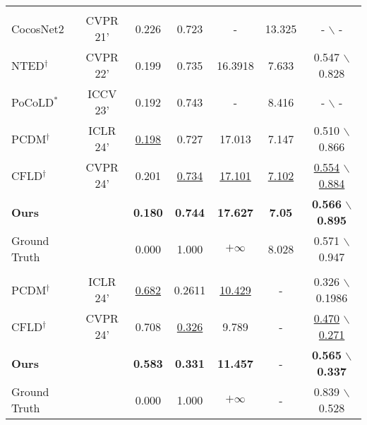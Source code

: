 \begin{tabular}{l| c| c| c| c| c| c}
    \midrule
        \rowcolor{gray!20}
            \multicolumn{7}{l}{\textit{DeepFashion (512 $\times$ 352)}} \\
             CocosNet2\cite{zhou2021cocosnet} & CVPR 21' & 0.226 & 0.723 & - & 13.325 & - $\backslash$ -\\
             NTED$^\dagger$\cite{ren2022neural} & CVPR 22' & 0.199 & 0.735 & 16.3918 & 7.633 & 0.547 $\backslash$ 0.828 \\
             \color{gray}PoCoLD$^\ast$ \cite{han2023controllable} &  \color{gray}ICCV 23' &  \color{gray}0.192 &  \color{gray}0.743 & - &  \color{gray}8.416 & - $\backslash$ -\\
             PCDM$^\dagger$\cite{shen2024advancing} & ICLR 24' & \underline{0.198} & 0.727 & 17.013 & 7.147 & 0.510 $\backslash$ 0.866 \\ %
             CFLD$^\dagger$\cite{lu2024coarse} & CVPR 24' & 0.201 & \underline{0.734} & \underline{17.101} & \underline{7.102} & \underline{0.554} $\backslash$ \underline{0.884} \\ %
            \textbf{Ours} &  & \textbf{0.180} & \textbf{0.744} & \textbf{17.627} & \textbf{7.05} & \textbf{0.566} $\backslash$ \textbf{0.895} \\
            \color{gray} Ground Truth &  & \color{gray}0.000 & \color{gray} 1.000 & \color{gray} $+\infty$  & \color{gray} 8.028 & \color{gray} 0.571 $\backslash$ \color{gray} 0.947\\
    \midrule
        \rowcolor{gray!20}
            \multicolumn{7}{l}{\textit{WPose (512 $\times$ 352)}} \\
            PCDM$^\dagger$\cite{shen2024advancing} & ICLR 24' & \underline{0.682} & 0.2611 & \underline{10.429} & - & 0.326 $\backslash$ 0.1986  \\
            CFLD$^\dagger$\cite{lu2024coarse} & CVPR 24' & 0.708 & \underline{0.326} & 9.789 & - & \underline{0.470} $\backslash$ \underline{0.271}  \\
            \textbf{Ours} & & \textbf{0.583} & \textbf{0.331} & \textbf{11.457} & - & \textbf{0.565} $\backslash$ \textbf{0.337} \\
            \color{gray} Ground Truth &  & \color{gray}0.000 & \color{gray} 1.000 & \color{gray} $+\infty$ & - & \color{gray} 0.839 $\backslash$ \color{gray} 0.528 \\
    \toprule
\end{tabular}
